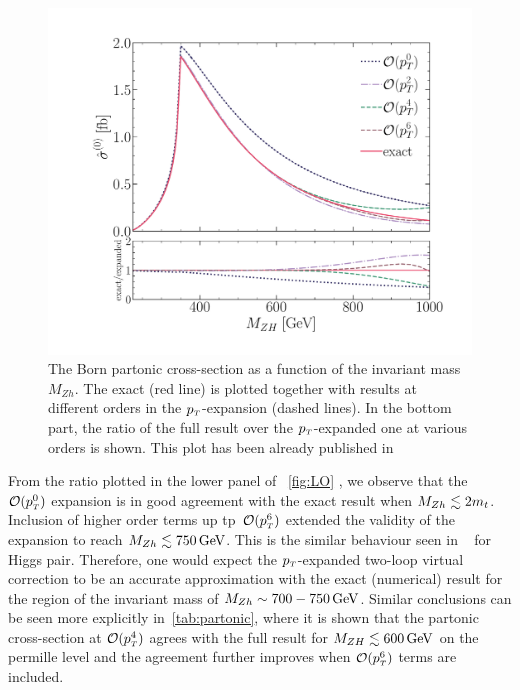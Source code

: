 \begin{figure}[t]
	\centering
	\includegraphics[width=0.8\linewidth]{./figures/LO_ptexp_ratio_1000.pdf}
	\caption{The Born partonic cross-section
		as a function of the invariant mass $M_{Zh}$.
		The exact (red line) is plotted together with results at
		different orders in the $p_{\scriptscriptstyle T}$-expansion (dashed lines). In the bottom part,
		the ratio of the full result over the $p_{\scriptscriptstyle T}$-expanded one at
		various orders is shown. This plot has been already published in~\cite{Alasfar:2021ppe}}
	\label{fig:LO}
\end{figure}
From the ratio plotted in the lower panel of ~\autoref{fig:LO} , we observe that the~$\mathcal{O}(p_{\scriptscriptstyle T}^0)$ expansion is in good agreement with the exact result  when $M_{Zh}\lesssim 2m_t$. Inclusion of higher order terms up tp~$\mathcal{O}(p_{\scriptscriptstyle T}^6)$ extended the validity of the expansion to reach  $M_{Zh}\lesssim 750\,\textrm{GeV}$. This is the similar behaviour seen in ~\cite{Bonciani:2018omm} for Higgs pair.  Therefore, one would expect the $p_{\scriptscriptstyle T}$-expanded two-loop virtual correction to be an accurate approximation with the exact (numerical) result for the region of the invariant mass of  $M_{Zh}\sim 700-750\,\textrm{GeV}$. 
Similar conclusions can be seen more explicitly in~\autoref{tab:partonic}, where it is shown that the partonic cross-section
at $\mathcal{O}(p_{\scriptscriptstyle T}^4)$ agrees with the full result for
$M_{ZH} \lesssim 600 \,\textrm{GeV}$  on the permille level 
and the agreement further improves when $\mathcal{O}(p_{\scriptscriptstyle T}^6)$ terms are included.
